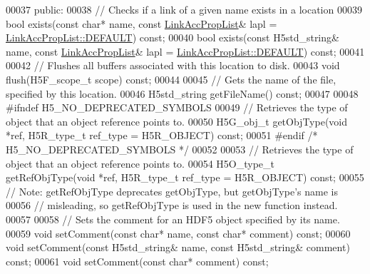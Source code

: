 \begin{DoxyCode}
00037    \textcolor{keyword}{public}:
00038         \textcolor{comment}{// Checks if a link of a given name exists in a location}
00039         \textcolor{keywordtype}{bool} exists(\textcolor{keyword}{const} \textcolor{keywordtype}{char}* name, \textcolor{keyword}{const} \hyperlink{class_h5_1_1_link_acc_prop_list}{LinkAccPropList}& lapl = 
      \hyperlink{class_h5_1_1_link_acc_prop_list_abbf34b03d8f8c9cf225c704d59ebb7a8}{LinkAccPropList::DEFAULT}) \textcolor{keyword}{const};
00040         \textcolor{keywordtype}{bool} exists(\textcolor{keyword}{const} H5std\_string& name, \textcolor{keyword}{const} \hyperlink{class_h5_1_1_link_acc_prop_list}{LinkAccPropList}& lapl = 
      \hyperlink{class_h5_1_1_link_acc_prop_list_abbf34b03d8f8c9cf225c704d59ebb7a8}{LinkAccPropList::DEFAULT}) \textcolor{keyword}{const};
00041 
00042         \textcolor{comment}{// Flushes all buffers associated with this location to disk.}
00043         \textcolor{keywordtype}{void} flush(H5F\_scope\_t scope) \textcolor{keyword}{const};
00044 
00045         \textcolor{comment}{// Gets the name of the file, specified by this location.}
00046         H5std\_string getFileName() \textcolor{keyword}{const};
00047 
00048 \textcolor{preprocessor}{#ifndef H5\_NO\_DEPRECATED\_SYMBOLS}
00049         \textcolor{comment}{// Retrieves the type of object that an object reference points to.}
00050         H5G\_obj\_t getObjType(\textcolor{keywordtype}{void} *ref, H5R\_type\_t ref\_type = H5R\_OBJECT) \textcolor{keyword}{const};
00051 \textcolor{preprocessor}{#endif }\textcolor{comment}{/* H5\_NO\_DEPRECATED\_SYMBOLS */}\textcolor{preprocessor}{}
00052 
00053         \textcolor{comment}{// Retrieves the type of object that an object reference points to.}
00054         H5O\_type\_t getRefObjType(\textcolor{keywordtype}{void} *ref, H5R\_type\_t ref\_type = H5R\_OBJECT) \textcolor{keyword}{const};
00055         \textcolor{comment}{// Note: getRefObjType deprecates getObjType, but getObjType's name is}
00056         \textcolor{comment}{// misleading, so getRefObjType is used in the new function instead.}
00057 
00058         \textcolor{comment}{// Sets the comment for an HDF5 object specified by its name.}
00059         \textcolor{keywordtype}{void} setComment(\textcolor{keyword}{const} \textcolor{keywordtype}{char}* name, \textcolor{keyword}{const} \textcolor{keywordtype}{char}* comment) \textcolor{keyword}{const};
00060         \textcolor{keywordtype}{void} setComment(\textcolor{keyword}{const} H5std\_string& name, \textcolor{keyword}{const} H5std\_string& comment) \textcolor{keyword}{const};
00061         \textcolor{keywordtype}{void} setComment(\textcolor{keyword}{const} \textcolor{keywordtype}{char}* comment) \textcolor{keyword}{const};

\end{DoxyCode}
